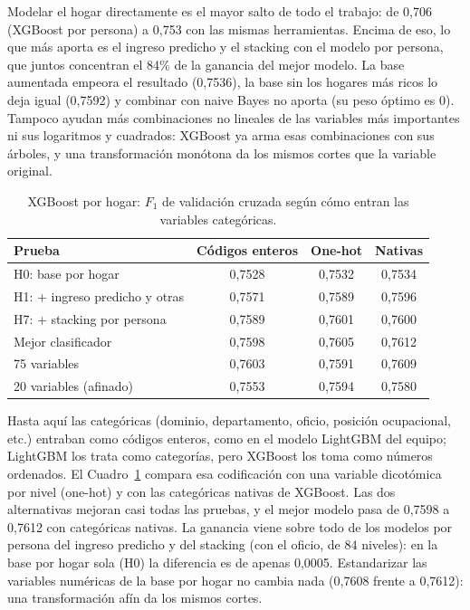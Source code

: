 \documentclass[12pt]{article}
\begin{document}
Modelar el hogar directamente es el mayor salto de todo el trabajo: de 0,706
(XGBoost por persona) a 0,753 con las mismas herramientas. Encima de eso, lo
que más aporta es el ingreso predicho y el stacking con el modelo por persona,
que juntos concentran el 84\% de la ganancia del mejor modelo. La base
aumentada empeora el resultado (0,7536), la base sin los hogares más ricos lo
deja igual (0,7592) y combinar con naive Bayes no aporta (su peso óptimo es
0). Tampoco ayudan más combinaciones no lineales de las variables más
importantes ni sus logaritmos y cuadrados: XGBoost ya arma esas combinaciones
con sus árboles, y una transformación monótona da los mismos cortes que la
variable original.

\begin{table}[H]
  \centering
  \small
  \caption{XGBoost por hogar: $F_1$ de validación cruzada según cómo entran las
    variables categóricas.}
  \label{tab:codificacion}
  \begin{tabular}{@{}lccc@{}}
    \toprule
    Prueba & Códigos enteros & One-hot & Nativas \\
    \midrule
    H0: base por hogar & 0,7528 & 0,7532 & 0,7534 \\
    H1: + ingreso predicho y otras & 0,7571 & 0,7589 & 0,7596 \\
    H7: + stacking por persona & 0,7589 & 0,7601 & 0,7600 \\
    Mejor clasificador & 0,7598 & 0,7605 & 0,7612 \\
    75 variables & 0,7603 & 0,7591 & 0,7609 \\
    20 variables (afinado) & 0,7553 & 0,7594 & 0,7580 \\
    \bottomrule
  \end{tabular}
\end{table}

Hasta aquí las categóricas (dominio, departamento, oficio, posición
ocupacional, etc.) entraban como códigos enteros, como en el modelo LightGBM
del equipo; LightGBM los trata como categorías, pero XGBoost los toma como
números ordenados. El Cuadro~\ref{tab:codificacion} compara esa codificación
con una variable dicotómica por nivel (one-hot) y con las categóricas nativas
de XGBoost. Las dos alternativas mejoran casi todas las pruebas, y el mejor
modelo pasa de 0,7598 a 0,7612 con categóricas nativas. La ganancia viene
sobre todo de los modelos por persona del ingreso predicho y del stacking
(con el oficio, de 84 niveles): en la base por hogar sola (H0) la diferencia
es de apenas 0,0005. Estandarizar las variables numéricas de la base por
hogar no cambia nada (0,7608 frente a 0,7612): una transformación afín da los
mismos cortes.
\end{document}
